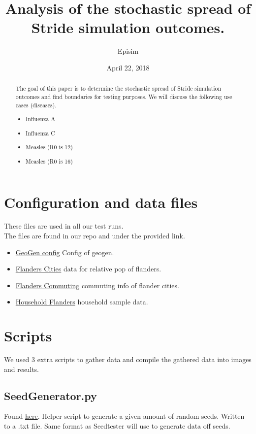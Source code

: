 \documentclass[a4paper]{article}
\title{Analysis of the stochastic spread of Stride
simulation  outcomes.}
\author{Episim}
\date{April 22, 2018}
\begin{document}
\maketitle

\begin{abstract}
\noindent
The goal of this paper is to determine the stochastic spread of Stride simulation outcomes and find boundaries for testing purposes. We will discuss the following use cases (diseases).\\
\begin{itemize}
\item Influenza A
\item Influenza C
\item Measles (R0 is 12)
\item Measles (R0 is 16)
\\
\end{itemize}
\end{abstract}
\section{Configuration and data files}
These files are used in all our test runs. \\
The files are found in our repo and under the provided link.
\\
\begin{itemize}
\item  \href{https://github.com/RobbeHeirman/Configs/blob/master/config/geogen_default.xml}{GeoGen config} Config of geogen.
\item \href{https://github.com/RobbeHeirman/Configs/blob/master/data/flanders_cities.csv}{Flanders Cities} data for relative pop of flanders.
\item \href{https://github.com/RobbeHeirman/Configs/blob/master/data/flanders_commuting.csv}{Flanders Commuting} commuting info of flander cities.
\item \href{https://github.com/RobbeHeirman/Configs/blob/master/data/households_flanders.xml}{Household Flanders} household sample data.
\end{itemize}
\section{Scripts}
We used 3 extra scripts to gather data and compile the gathered data into images and results.

\subsection{SeedGenerator.py}
Found \href{https://github.com/RobbeHeirman/Configs/blob/master/Scripts/seedGenerator.py}{here}.
Helper script to generate a given amount of random seeds. Written to a .txt file. Same format as Seedtester will use to generate data off seeds.
\end{document}
